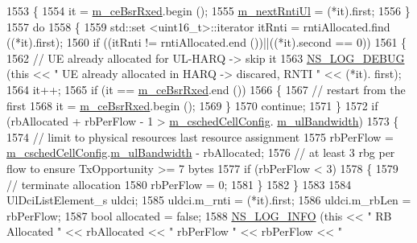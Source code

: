 \begin{DoxyCode}
1553     \{
1554       it = \hyperlink{classns3_1_1FdMtFfMacScheduler_a10a21cad9af4c783734123f38e697316}{m\_ceBsrRxed}.begin ();
1555       \hyperlink{classns3_1_1FdMtFfMacScheduler_ae8ab0aba539cbc8f37e1f593353063e0}{m\_nextRntiUl} = (*it).first;
1556     \}
1557   \textcolor{keywordflow}{do}
1558     \{
1559       std::set <uint16\_t>::iterator itRnti = rntiAllocated.find ((*it).first);
1560       \textcolor{keywordflow}{if} ((itRnti != rntiAllocated.end ())||((*it).second == 0))
1561         \{
1562           \textcolor{comment}{// UE already allocated for UL-HARQ -> skip it}
1563           \hyperlink{group__logging_ga413f1886406d49f59a6a0a89b77b4d0a}{NS\_LOG\_DEBUG} (\textcolor{keyword}{this} << \textcolor{stringliteral}{" UE already allocated in HARQ -> discared, RNTI "} << (*it).
      first);
1564           it++;
1565           \textcolor{keywordflow}{if} (it == \hyperlink{classns3_1_1FdMtFfMacScheduler_a10a21cad9af4c783734123f38e697316}{m\_ceBsrRxed}.end ())
1566             \{
1567               \textcolor{comment}{// restart from the first}
1568               it = \hyperlink{classns3_1_1FdMtFfMacScheduler_a10a21cad9af4c783734123f38e697316}{m\_ceBsrRxed}.begin ();
1569             \}
1570           \textcolor{keywordflow}{continue};
1571         \}
1572       \textcolor{keywordflow}{if} (rbAllocated + rbPerFlow - 1 > \hyperlink{classns3_1_1FdMtFfMacScheduler_a9f2e3c6bfae8bfc266a84f64e5937ac8}{m\_cschedCellConfig}.
      \hyperlink{structns3_1_1FfMacCschedSapProvider_1_1CschedCellConfigReqParameters_a5ab5b102878e6e7e7727a14af4a64d2f}{m\_ulBandwidth})
1573         \{
1574           \textcolor{comment}{// limit to physical resources last resource assignment}
1575           rbPerFlow = \hyperlink{classns3_1_1FdMtFfMacScheduler_a9f2e3c6bfae8bfc266a84f64e5937ac8}{m\_cschedCellConfig}.\hyperlink{structns3_1_1FfMacCschedSapProvider_1_1CschedCellConfigReqParameters_a5ab5b102878e6e7e7727a14af4a64d2f}{m\_ulBandwidth} - rbAllocated;
1576           \textcolor{comment}{// at least 3 rbg per flow to ensure TxOpportunity >= 7 bytes}
1577           \textcolor{keywordflow}{if} (rbPerFlow < 3)
1578             \{
1579               \textcolor{comment}{// terminate allocation}
1580               rbPerFlow = 0;      
1581             \}
1582         \}
1583 
1584       UlDciListElement\_s uldci;
1585       uldci.m\_rnti = (*it).first;
1586       uldci.m\_rbLen = rbPerFlow;
1587       \textcolor{keywordtype}{bool} allocated = \textcolor{keyword}{false};
1588       \hyperlink{group__logging_gafbd73ee2cf9f26b319f49086d8e860fb}{NS\_LOG\_INFO} (\textcolor{keyword}{this} << \textcolor{stringliteral}{" RB Allocated "} << rbAllocated << \textcolor{stringliteral}{" rbPerFlow "} << rbPerFlow << \textcolor{stringliteral}{"
}
\end{DoxyCode}
